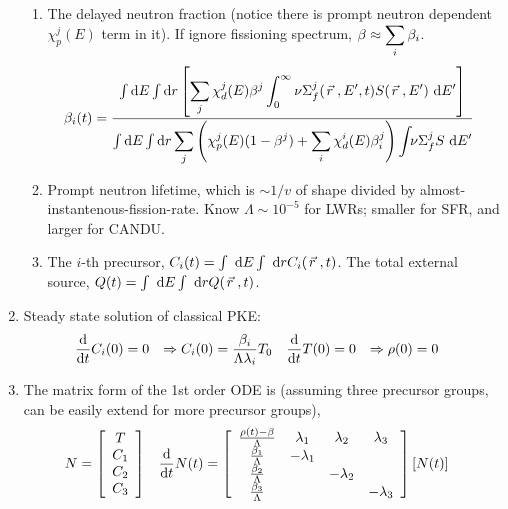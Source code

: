 \documentclass{school-22.211-notes}
\begin{document}
\begin{enumerate}
\begin{enumerate}
      \item The delayed neutron fraction (notice there is prompt neutron dependent $\chi_p^j(E)$ term in it). If ignore fissioning spectrum, $\beta \approx \displaystyle\sum_i \beta_i$. 
        \begin{align}
          \beta_i (t) &= \frac{\int \bsp \dE \int \bsp \dr \left[ \Sum_j \chi_d^j (E) \beta^j \int_0^{\infty} \nu \Sigma_f^j (\vecr, E', t) S(\vecr, E') \dE' \right] }{\int \bsp \dE \int \bsp \dr \Sum_j \left( \chi_p^j (E) (1-\beta^j) + \Sum_i \chi_d^i (E) \beta_i^j \right) \int \bsp \nu \Sigma_f^j S \dE'} 
        \end{align}

      \item Prompt neutron lifetime, which is $\sim 1/v$ of shape divided by almost-instantenous-fission-rate. Know $\Lambda \sim 10^{-5}$ for LWRs; smaller for SFR, and larger for CANDU. 

      \item The $i$-th precursor, $C_i (t) = \int \mbox{ }\mathrm{d} E \int \mbox{ }\mathrm{d} r C_i (\left.\vec{r}\right., t)$. The total external source, $Q(t) = \int \mbox{ }\mathrm{d} E \int \mbox{ }\mathrm{d} r Q (\left.\vec{r}\right., t)$. 
      \end{enumerate}




\item Steady state solution of classical PKE: 
  \begin{align}
    \frac{\mathrm{d}}{\mathrm{d}t} C_i (0) &= 0  &\Rightarrow  C_i (0) &= \frac{\beta_i}{\Lambda \lambda_i} T_0  &  \frac{\mathrm{d}}{\mathrm{d}t} T(0) &= 0  &\Rightarrow \rho(0) &= 0  \label{in-hour}
  \end{align}

\item The matrix form of the 1st order ODE is (assuming three precursor groups, can be easily extend for more precursor groups),  
\begin{align}
N &= \left[ \begin{array}{c} T \\ C_1 \\ C_2 \\ C_3 \end{array} \right]  
& \frac{\mathrm{d}}{\mathrm{d}t} N(t) &= \left[ \begin{array}{cccc} 
\frac{\rho(t) - \beta}{\Lambda} & \lambda_1 & \lambda_2 & \lambda_3 \\
\frac{\beta_1}{\Lambda} & - \lambda_1 & & \\
\frac{\beta_2}{\Lambda} & & -\lambda_2 & \\
\frac{\beta_3}{\Lambda} & & & -\lambda_3 \end{array} \right] 
\left[ N(t) \right] 
\end{align}


\end{enumerate}
\end{document}
